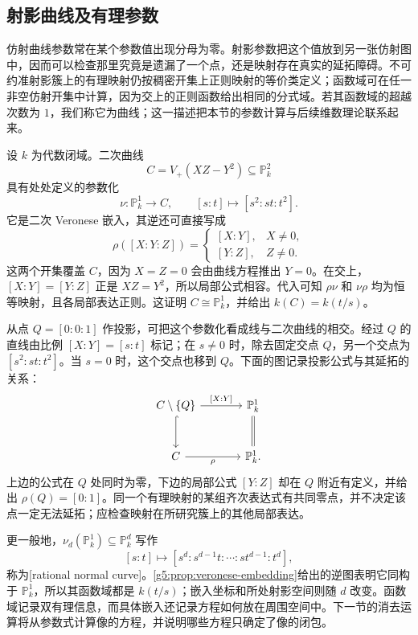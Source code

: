 \subsection{射影曲线及有理参数}
\label{g5:subsec:0103:04}

仿射曲线参数常在某个参数值出现分母为零。射影参数把这个值放到另一张仿射图中，因而可以检查那里究竟是遗漏了一个点，还是映射存在真实的延拓障碍。不可约准射影簇上的有理映射仍按稠密开集上正则映射的等价类定义；函数域可在任一非空仿射开集中计算，因为交上的正则函数给出相同的分式域。若其函数域的超越次数为 \(1\)，我们称它为曲线；这一描述把本节的参数计算与后续维数理论联系起来。

\begin{example}
\label{g5:exm:projective-conic-parameter}
	设 \(k\) 为代数闭域。二次曲线
	\[
		C=V_+(XZ-Y^2)\subseteq\mathbb P^2_k
	\]
	具有处处定义的参数化
	\[
		\nu:\mathbb P^1_k\longrightarrow C,\qquad[s:t]\longmapsto[s^2:st:t^2].
	\]
	它是二次 Veronese 嵌入，其逆还可直接写成
	\[
		\rho([X:Y:Z])=
		\begin{cases}
			[X:Y],&X\ne0,\\
			[Y:Z],&Z\ne0.
		\end{cases}
	\]
	这两个开集覆盖 \(C\)，因为 \(X=Z=0\) 会由曲线方程推出 \(Y=0\)。在交上，\([X:Y]=[Y:Z]\) 正是 \(XZ=Y^2\)，所以局部公式相容。代入可知 \(\rho\nu\) 和 \(\nu\rho\) 均为恒等映射，且各局部表达正则。这证明 \(C\cong\mathbb P^1_k\)，并给出 \(k(C)=k(t/s)\)。
\end{example}

从点 \(Q=[0:0:1]\) 作投影，可把这个参数化看成线与二次曲线的相交。经过 \(Q\) 的直线由比例 \([X:Y]=[s:t]\) 标记；在 \(s\ne0\) 时，除去固定交点 \(Q\)，另一个交点为 \([s^2:st:t^2]\)。当 \(s=0\) 时，这个交点也移到 \(Q\)。下面的图记录投影公式与其延拓的关系：
\[
	\begin{tikzcd}[column sep=large,row sep=large]
		C\setminus\{Q\}\arrow[r,"{[X:Y]}"]\arrow[d,hook]
		&\mathbb P^1_k\arrow[d,equal]\\
		C\arrow[r,"\rho"']&\mathbb P^1_k.
	\end{tikzcd}
\]
上边的公式在 \(Q\) 处同时为零，下边的局部公式 \([Y:Z]\) 却在 \(Q\) 附近有定义，并给出 \(\rho(Q)=[0:1]\)。同一个有理映射的某组齐次表达式有共同零点，并不决定该点一定无法延拓；应检查映射在所研究簇上的其他局部表达。

更一般地，\(\nu_d(\mathbb P^1_k)\subseteq\mathbb P^d_k\) 写作
\[
	[s:t]\longmapsto[s^d:s^{d-1}t:\cdots:st^{d-1}:t^d],
\]
称为[rational normal curve]。\cref{g5:prop:veronese-embedding}给出的逆图表明它同构于 \(\mathbb P^1_k\)，所以其函数域都是 \(k(t/s)\)；嵌入坐标和所处射影空间则随 \(d\) 改变。函数域记录双有理信息，而具体嵌入还记录方程如何放在周围空间中。下一节的消去运算将从参数式计算像的方程，并说明哪些方程只确定了像的闭包。
